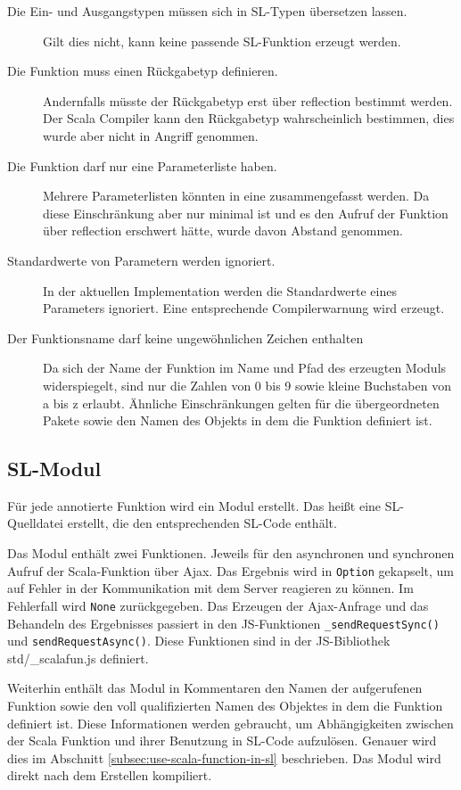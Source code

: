 \documentclass[12pt,bibtotoc]{scrreprt}
\begin{document}
\begin{description}
 \item[Die Ein- und Ausgangstypen müssen sich in SL-Typen übersetzen lassen.]{Gilt dies nicht, kann keine passende SL-Funktion erzeugt werden.}
 \item[Die Funktion muss einen Rückgabetyp definieren.]{Andernfalls müsste der Rückgabetyp erst über reflection bestimmt werden. Der Scala Compiler kann den Rückgabetyp wahrscheinlich bestimmen, dies wurde aber nicht in Angriff genommen.}
 \item[Die Funktion darf nur eine Parameterliste haben.]{Mehrere Parameterlisten könnten in eine zusammengefasst werden. Da diese Einschränkung aber nur minimal ist und es den Aufruf der Funktion über reflection erschwert hätte, wurde davon Abstand genommen.}
 \item[Standardwerte von Parametern werden ignoriert.]{In der aktuellen Implementation werden die Standardwerte eines Parameters ignoriert. Eine entsprechende Compilerwarnung wird erzeugt.}
 \item[Der Funktionsname darf keine ungewöhnlichen Zeichen enthalten]{Da sich der Name der Funktion im Name und Pfad des erzeugten Moduls widerspiegelt, sind nur die Zahlen von 0 bis 9 sowie kleine Buchstaben von a bis z erlaubt. Ähnliche Einschränkungen gelten für die übergeordneten Pakete sowie den Namen des Objekts in dem die Funktion definiert ist.}
\end{description}

\subsection{SL-Modul}
\label{subsec:sl-modul}

Für jede annotierte Funktion wird ein Modul erstellt. Das heißt eine SL-Quelldatei erstellt, die den entsprechenden SL-Code enthält.

Das Modul enthält zwei Funktionen. Jeweils für den asynchronen und synchronen Aufruf der Scala-Funktion über Ajax. Das Ergebnis wird in \lstinline!Option! gekapselt, um auf Fehler in der Kommunikation mit dem Server reagieren zu können. Im Fehlerfall wird \lstinline!None! zurückgegeben. Das Erzeugen der Ajax-Anfrage und das Behandeln des Ergebnisses passiert in den \ac{JS}-Funktionen \lstinline!_sendRequestSync()! und \lstinline!sendRequestAsync()!. Diese Funktionen sind in der \ac{JS}-Bibliothek std/\_scalafun.js definiert. 

Weiterhin enthält das Modul in Kommentaren den Namen der aufgerufenen Funktion sowie den voll qualifizierten Namen des Objektes in dem die Funktion definiert ist. Diese Informationen werden gebraucht, um Abhängigkeiten zwischen der Scala Funktion und ihrer Benutzung in \ac{SL}-Code aufzulösen. Genauer wird dies im Abschnitt \ref{subsec:use-scala-function-in-sl} beschrieben. Das Modul wird direkt nach dem Erstellen kompiliert.
\end{document}
